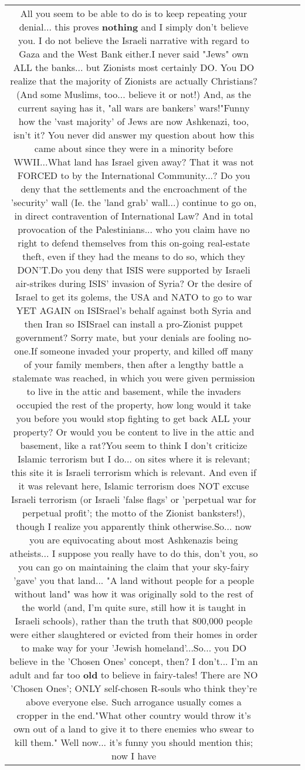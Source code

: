 \documentclass[11pt]{article}
\newlength\mylength
\begin{document}
\begin{center}
\begin{longtable}{|C{.65\mylength}|C{.30\mylength}|C{.12\mylength}|C{.12\mylength}|C{.12\mylength}|}
  \small All you seem to be able to do is to keep repeating your denial... this proves \textbf{nothing} and I simply don't believe you. I do not believe the Israeli narrative with regard to Gaza and the West Bank either.I never said "Jews" own ALL the banks... but Zionists most certainly DO. You DO realize that the majority of Zionists are actually Christians? (And some Muslims, too... believe it or not!) And, as the current saying has it, "all wars are bankers' wars!"Funny how the 'vast majority' of Jews are now Ashkenazi, too, isn't it? You never did answer my question about how this came about since they were in a minority before WWII...What land has Israel given away? That it was not FORCED to by the International Community...? Do you deny that the settlements and the encroachment of the 'security' wall (Ie. the 'land grab' wall...) continue to go on, in direct contravention of International Law? And in total provocation of the Palestinians... who you claim have no right to defend themselves from this on-going real-estate theft, even if they had the means to do so, which they DON'T.Do you deny that ISIS were supported by Israeli air-strikes during ISIS' invasion of Syria? Or the desire of Israel to get its golems, the USA and NATO to go to war YET AGAIN on ISISrael's behalf against both Syria and then Iran so ISISrael can install a pro-Zionist puppet government? Sorry mate, but your denials are fooling no-one.If someone invaded your property, and killed off many of your family members, then after a lengthy battle a stalemate was reached, in which you were given permission to live in the attic and basement, while the invaders occupied the rest of the property, how long would it take you before you would stop fighting to get back ALL your property? Or would you be content to live in the attic and basement, like a rat?You seem to think I don't criticize Islamic terrorism but I do... on sites where it is relevant; this site it is Israeli terrorism which is relevant. And even if it was relevant here, Islamic terrorism does NOT excuse Israeli terrorism (or Israeli 'false flags' or 'perpetual war for perpetual profit'; the motto of the Zionist banksters!), though I realize you apparently think otherwise.So... now you are equivocating about most Ashkenazis being atheists... I suppose you really have to do this, don't you, so you can go on maintaining the claim that your sky-fairy 'gave' you that land... "A land without people for a people without land" was how it was originally sold to the rest of the world (and, I'm quite sure, still how it is taught in Israeli schools), rather than the truth that 800,000 people were either slaughtered or evicted from their homes in order to make way for your 'Jewish homeland'...So... you DO believe in the 'Chosen Ones' concept, then? I don't... I'm an adult and far too \textbf{old} to believe in fairy-tales! There are NO 'Chosen Ones'; ONLY self-chosen R-souls who think they're above everyone else. Such arrogance usually comes a cropper in the end."What other country would throw it's own out of a land to give it to there enemies who swear to kill them." Well now... it's funny you should mention this; now I have 
\end{longtable}
\end{center}
\end{document}

